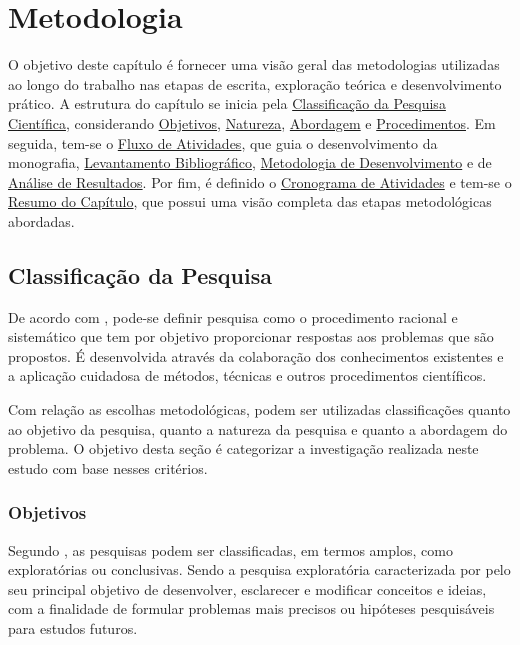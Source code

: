 \chapter[Metodologia]{Metodologia}
\label{chap:Metodologia}

O objetivo deste capítulo é fornecer uma visão geral das metodologias utilizadas ao longo do trabalho nas etapas de escrita, exploração teórica e desenvolvimento prático. 
A estrutura do capítulo se inicia pela \hyperref[sec:Classificacao da Pesquisa]{Classificação da Pesquisa Científica}, considerando \hyperref[sec:Objetivos2]{Objetivos}, \hyperref[sec:Natureza]{Natureza}, \hyperref[Abordagem]{Abordagem} e \hyperref[Procedimentos]{Procedimentos}. 
Em seguida, tem-se o \hyperref[sec:Fluxo de Atividades]{Fluxo de Atividades}, que guia o desenvolvimento da monografia, \hyperref[sec:Levantamento Bibliografico]{Levantamento Bibliográfico}, \hyperref[sec:Metodologia de Desenvolvimento]{Metodologia de Desenvolvimento} e de 
\hyperref[sec:Metodologia de Analise de Resultados]{Análise de Resultados}. Por fim, é definido o \hyperref[sec:Cronograma]{Cronograma de Atividades} e tem-se o \hyperref[sec:Resumo do Capitulo]{Resumo do Capítulo}, que possui uma visão completa das etapas 
metodológicas abordadas.

\section{Classificação da Pesquisa}
\label{sec:Classificacao da Pesquisa}
De acordo com , pode-se definir pesquisa como o procedimento racional e sistemático que tem por objetivo proporcionar respostas aos problemas que são propostos. É desenvolvida através da colaboração 
dos conhecimentos existentes e a aplicação cuidadosa de métodos, técnicas e outros procedimentos científicos.

Com relação as escolhas metodológicas, podem ser utilizadas classificações quanto ao objetivo da pesquisa, quanto a natureza da pesquisa e quanto a abordagem do problema. O objetivo desta seção é 
categorizar a investigação realizada neste estudo com base nesses critérios.

\subsection{Objetivos}
\label{sec:Objetivos2}
Segundo , as pesquisas podem ser classificadas, em termos amplos, como exploratórias ou conclusivas. Sendo a pesquisa exploratória caracterizada por  pelo seu principal objetivo de 
desenvolver, esclarecer e modificar conceitos e ideias, com a finalidade de formular problemas mais precisos ou hipóteses pesquisáveis para estudos futuros.

